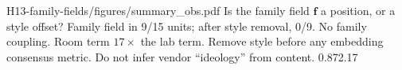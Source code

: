 {H13-family-fields/figures/summary_obs.pdf}
{Is the family field $\mathbf f$ a position, or a style offset?}
{Family field in 9/15 units; after style removal, 0/9. No family coupling. Room term $17\times$ the lab term.}
{Remove style before any embedding consensus metric. Do not infer vendor ``ideology'' from content.}
{0.87}{2.17}
